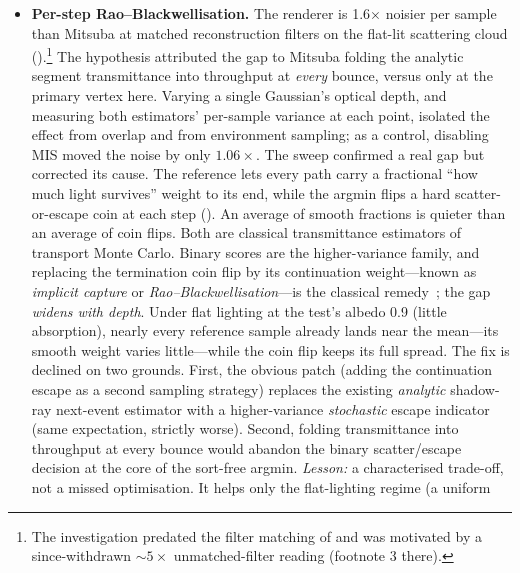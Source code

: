 \begin{itemize}
  working threshold nothing early-stops on the high-variance cloud. It therefore matches uniform
  sampling at identical quality but runs \num{0.9}\,\% slower (\num{0.7}\,\% on the calibrated-caps
  re-confirmation) and reserves an extra per-pixel variance buffer. A
  more aggressive threshold only trades that overhead for firefly bias. Kept, default-off.
  \item \textbf{Per-step Rao--Blackwellisation.} The renderer
  is \num{1.6}$\times$ noisier per sample than Mitsuba at matched reconstruction filters on the
  flat-lit scattering cloud ().\footnote{The investigation predated the filter matching of  and was
motivated by a since-withdrawn ${\sim}5\times$ unmatched-filter reading (footnote 3
there).} The hypothesis attributed the gap to Mitsuba folding the analytic segment transmittance
  into throughput at \emph{every} bounce, versus only at the primary vertex here. Varying a single Gaussian's optical depth, and measuring both estimators' per-sample
variance at each point, isolated the effect from overlap and from environment sampling; as
a control, disabling MIS
  moved the noise by only $1.06\times$. The sweep confirmed a real gap but corrected its cause.
  The reference lets every path carry a
  fractional ``how much light survives'' weight to its end, while the argmin flips a hard
  scatter-or-escape coin at each step (). An average of smooth fractions is
  quieter than an average of coin flips. Both are classical transmittance estimators of transport Monte Carlo. Binary scores are the
higher-variance family, and replacing the termination coin flip by its continuation
weight---known as \emph{implicit capture} or \emph{Rao--Blackwellisation}---is the
classical remedy~\cite{Novak2018}; the gap \emph{widens with depth}. Under flat lighting at
the test's albedo \num{0.9} (little absorption), nearly every reference sample already
lands near the mean---its smooth weight varies little---while the coin flip keeps its full
spread.
  The fix is declined on two grounds. First, the obvious patch
  (adding the continuation escape as a second sampling strategy) replaces the existing \emph{analytic}
  shadow-ray next-event estimator with a higher-variance \emph{stochastic} escape indicator (same
  expectation, strictly worse). Second, folding transmittance into throughput at every bounce would abandon
  the binary scatter/escape decision at the core of the sort-free argmin. \emph{Lesson:} a characterised
  trade-off, not a missed optimisation. It helps only the flat-lighting regime (a uniform

\end{itemize}
